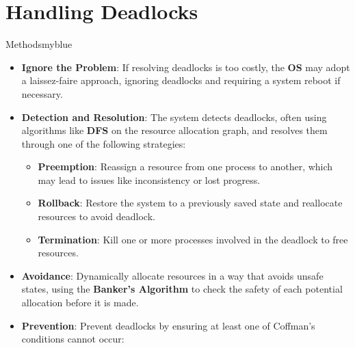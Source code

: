 \section{Handling Deadlocks}
\begin{prettyBox}{Methods}{myblue}
\begin{itemize}
    \item \textbf{Ignore the Problem}: If resolving deadlocks is too costly, the \textbf{OS} may adopt a laissez-faire approach, ignoring deadlocks and requiring a system reboot if necessary.
    \item \textbf{Detection and Resolution}: The system detects deadlocks, often using algorithms like \textbf{DFS} on the resource allocation graph, and resolves them through one of the following strategies:
    \begin{itemize}
        \item \textbf{Preemption}: Reassign a resource from one process to another, which may lead to issues like inconsistency or lost progress.
        \item \textbf{Rollback}: Restore the system to a previously saved state and reallocate resources to avoid deadlock.
        \item \textbf{Termination}: Kill one or more processes involved in the deadlock to free resources.
    \end{itemize}
    
   \item \textbf{Avoidance}: Dynamically allocate resources in a way that avoids unsafe states, using the \textbf{Banker's Algorithm} to check the safety of each potential allocation before it is made.

    \item \textbf{Prevention}: Prevent deadlocks by ensuring at least one of Coffman’s conditions cannot occur:
    \begin{itemize}
        

\end{itemize}
\end{itemize}
\end{prettyBox}
